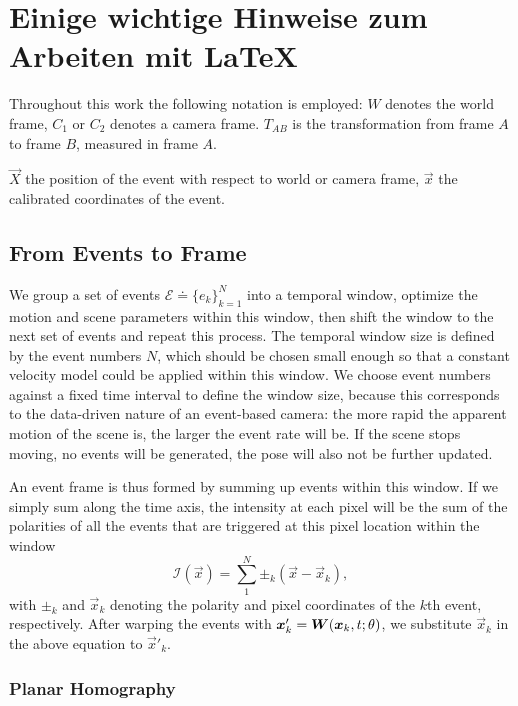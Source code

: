\chapter{Einige wichtige Hinweise zum Arbeiten mit \LaTeX\ }
\label{sec:latexumg}

Throughout this work the following notation is employed: $W$ denotes
the world frame, $C_1$ or $C_2$ denotes a camera frame.  $T_{AB}$ is
the transformation from frame $A$ to frame $B$, measured in frame $A$.

$\vec{X}$ the position of the event with respect to world or camera
frame, $\vec{x}$ the calibrated coordinates of the event.

\section{From Events to Frame}
\label{sec:event_warp}
We group a set of events $\mathscr{E}\doteq \{e_k\}_{k=1}^N$ into a
temporal window, optimize the motion and scene parameters within this
window, then shift the window to the next set of events and repeat
this process. The temporal window size is defined by the event numbers
$N$, which should be chosen small enough so that a constant velocity
model could be applied within this window. We choose event numbers
against a fixed time interval to define the window size, because this
corresponds to the data-driven nature of an event-based camera: the
more rapid the apparent motion of the scene is, the larger the event
rate will be. If the scene stops moving, no events will be generated,
the pose will also not be further updated.

An event frame is thus formed by summing up events within this
window. If we simply sum along the time axis, the intensity at each
pixel will be the sum of the polarities of all the events that are
triggered at this pixel location within the window
\begin{equation}
  \label{eq:intensity}
  \mathcal{I}(\vec{x}) = \sum_1^N\pm_k(\vec{x}-\vec{x}_k),
\end{equation}
with $\pm_k$ and $\vec{x}_k$ denoting the polarity and pixel
coordinates of the $k$th event, respectively. After warping the events
with $\vec{x}'_k=\mat{W}(\vec{x}_k,t;\theta)$, we substitute
$\vec{x}_k$ in the above equation to $\vec{x}'_k$.
\subsection{Planar Homography}

